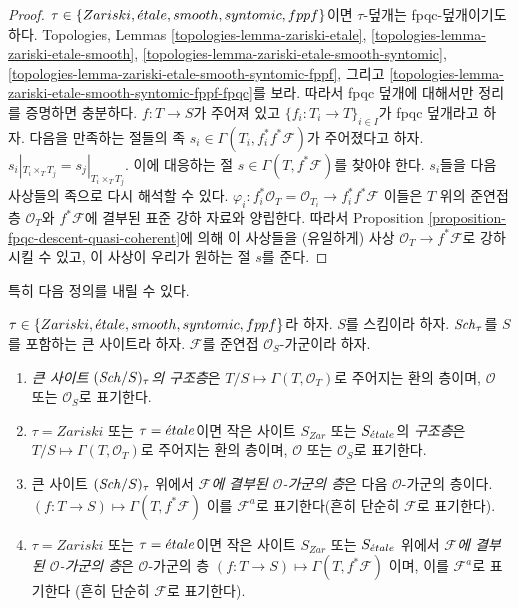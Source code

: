 \begin{proof}
$\tau \in \{Zariski, \linebreak[0] \etale, \linebreak[0] smooth,
\linebreak[0] syntomic, \linebreak[0] fppf\}$이면 $\tau$-덮개는
fpqc-덮개이기도 하다. Topologies, Lemmas
\ref{topologies-lemma-zariski-etale},
\ref{topologies-lemma-zariski-etale-smooth},
\ref{topologies-lemma-zariski-etale-smooth-syntomic},
\ref{topologies-lemma-zariski-etale-smooth-syntomic-fppf}, 그리고
\ref{topologies-lemma-zariski-etale-smooth-syntomic-fppf-fpqc}를 보라.
따라서 fpqc 덮개에 대해서만 정리를 증명하면 충분하다.
$f : T \to S$가 주어져 있고 $\{f_i : T_i \to T\}_{i \in I}$가
fpqc 덮개라고 하자. 다음을 만족하는 절들의 족
$s_i \in \Gamma(T_i , f_i^*f^*\mathcal{F})$가 주어졌다고 하자.
$s_i|_{T_i \times_T T_j} = s_j|_{T_i \times_T T_j}$.
이에 대응하는 절 $s \in \Gamma(T, f^*\mathcal{F})$를 찾아야 한다.
$s_i$들을 다음 사상들의 족으로 다시 해석할 수 있다.
$\varphi_i : f_i^*\mathcal{O}_T = \mathcal{O}_{T_i} \to f_i^*f^*\mathcal{F}$
이들은 $T$ 위의 준연접층 $\mathcal{O}_T$와 $f^*\mathcal{F}$에
결부된 표준 강하 자료와 양립한다. 따라서 Proposition
\ref{proposition-fpqc-descent-quasi-coherent}에 의해 이 사상들을
(유일하게) 사상 $\mathcal{O}_T \to f^*\mathcal{F}$로 강하시킬 수 있고,
이 사상이 우리가 원하는 절 $s$를 준다.
\end{proof}

\noindent
특히 다음 정의를 내릴 수 있다.

\begin{definition}
\label{definition-structure-sheaf}
$\tau \in \{Zariski, \linebreak[0] \etale, \linebreak[0]
smooth, \linebreak[0] syntomic, \linebreak[0] fppf\}$라 하자.
$S$를 스킴이라 하자.
$\mathit{Sch}_\tau$를 $S$를 포함하는 큰 사이트라 하자.
$\mathcal{F}$를 준연접 $\mathcal{O}_S$-가군이라 하자.
\begin{enumerate}
\item {\it 큰 사이트 $(\mathit{Sch}/S)_\tau$의 구조층}은
$T/S \mapsto \Gamma(T, \mathcal{O}_T)$로 주어지는 환의 층이며,
$\mathcal{O}$ 또는 $\mathcal{O}_S$로 표기한다.
\item $\tau = Zariski$ 또는 $\tau = {\acute{e}tale}$이면 작은 사이트
$S_{Zar}$ 또는 $S_{\acute{e}tale}$의 {\it 구조층}은
$T/S \mapsto \Gamma(T, \mathcal{O}_T)$로 주어지는 환의 층이며,
$\mathcal{O}$ 또는 $\mathcal{O}_S$로 표기한다.
\item 큰 사이트 $(\mathit{Sch}/S)_\tau$ 위에서
{\it $\mathcal{F}$에 결부된 $\mathcal{O}$-가군의 층}은
다음 $\mathcal{O}$-가군의 층이다.
$(f : T \to S) \mapsto \Gamma(T, f^*\mathcal{F})$
이를 $\mathcal{F}^a$로 표기한다(흔히 단순히 $\mathcal{F}$로 표기한다).
\item $\tau = Zariski$ 또는 $\tau = {\acute{e}tale}$이면 작은 사이트
$S_{Zar}$ 또는 $S_{\acute{e}tale}$ 위에서
{\it $\mathcal{F}$에 결부된 $\mathcal{O}$-가군의 층}은
$\mathcal{O}$-가군의 층 $(f : T \to S) \mapsto \Gamma(T, f^*\mathcal{F})$
이며, 이를 $\mathcal{F}^a$로 표기한다
(흔히 단순히 $\mathcal{F}$로 표기한다).
\end{enumerate}
\end{definition}

